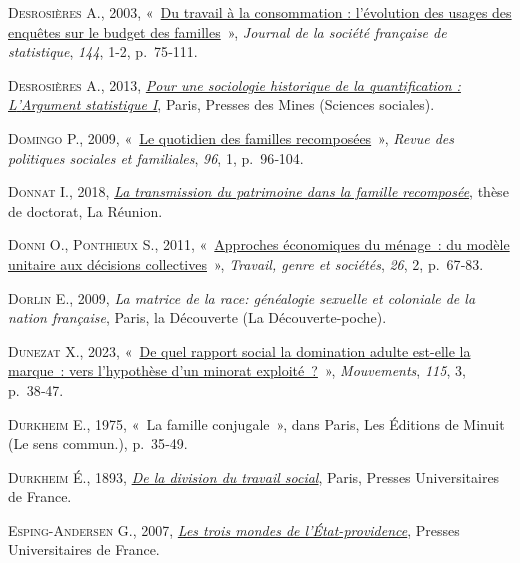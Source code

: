 \documentclass[
  12pt,
]{book}
\newlength{\cslhangindent}
\newenvironment{CSLReferences}[2] %
 {\begin{list}{}{%
  \setlength{\itemindent}{0pt}
  \setlength{\leftmargin}{0pt}
  \setlength{\parsep}{0pt}
  \ifodd #1
   \setlength{\leftmargin}{\cslhangindent}
   \setlength{\itemindent}{-1\cslhangindent}
  \fi
  \setlength{\itemsep}{#2\baselineskip}}}
 {\end{list}}
\begin{document}
\begin{CSLReferences}{0}{1}
\textsc{Desrosières A.}, 2003,
{«~\href{http://www.numdam.org/item/JSFS_2003__144_1-2_75_0/}{Du travail
à la consommation : l'évolution des usages des enquêtes sur le budget
des familles}~»}, \emph{Journal de la société française de statistique},
\emph{144}, 1-2, p.~75‑111.

\textsc{Desrosières A.}, 2013,
\emph{\href{http://books.openedition.org/pressesmines/901}{Pour une
sociologie historique de la quantification : L{'}Argument statistique
I}}, Paris, Presses des Mines (Sciences sociales).

\textsc{Domingo P.}, 2009,
{«~\href{https://doi.org/10.3406/caf.2009.2462}{Le quotidien des
familles recomposées}~»}, \emph{Revue des politiques sociales et
familiales}, \emph{96}, 1, p.~96‑104.

\textsc{Donnat I.}, 2018,
\emph{\href{http://www.theses.fr/2018LARE0021}{La transmission du
patrimoine dans la famille recomposée}}, thèse de doctorat, La Réunion.

\textsc{Donni O.}, \textsc{Ponthieux S.}, 2011,
{«~\href{https://doi.org/10.3917/tgs.026.0067}{Approches économiques du
ménage~: du modèle unitaire aux décisions collectives}~»},
\emph{Travail, genre et sociétés}, \emph{26}, 2, p.~67‑83.

\textsc{Dorlin E.}, 2009, \emph{La matrice de la race: généalogie
sexuelle et coloniale de la nation française}, Paris, la Découverte (La
Découverte-poche).

\textsc{Dunezat X.}, 2023,
{«~\href{https://doi.org/10.3917/mouv.115.0038}{De quel rapport social
la domination adulte est-elle la marque~: vers l{'}hypothèse d{'}un
minorat exploité~?}~»}, \emph{Mouvements}, \emph{115}, 3, p.~38‑47.

\textsc{Durkheim E.}, 1975, {«~La famille conjugale~»}, dans Paris, Les
Éditions de Minuit (Le sens commun.), p.~35‑49.

\textsc{Durkheim É.}, 1893,
\emph{\href{https://www.cairn.info/de-la-division-du-travail-social--9782130619574.htm}{De
la division du travail social}}, Paris, Presses Universitaires de
France.

\textsc{Esping-Andersen G.}, 2007,
\emph{\href{https://www.cairn.info/les-trois-mondes-de-l-etat-providence--9782130559160.htm}{Les
trois mondes de l'État-providence}}, Presses Universitaires de France.


\end{CSLReferences}
\end{document}
